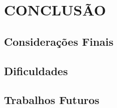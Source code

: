 \chapter{CONCLUSÃO}\label{conc}

\section{Considerações Finais}

\section{Dificuldades}

\section{Trabalhos Futuros}


